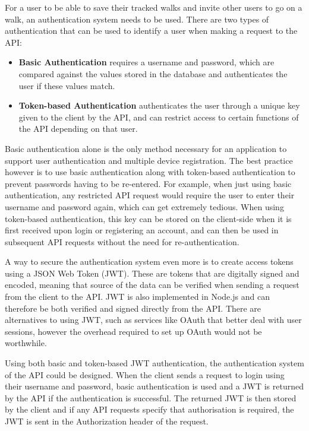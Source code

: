 For a user to be able to save their tracked walks and invite other users to go on a walk, an authentication system needs to be used. There are two types of authentication that can be used to identify a user when making a request to the API:

\begin{itemize}
  \item \textbf{Basic Authentication} requires a username and password, which are compared against the values stored in the database and authenticates the user if these values match.

  \item \textbf{Token-based Authentication} authenticates the user through a unique key given to the client by the API, and can restrict access to certain functions of the API depending on that user.
\end{itemize}

Basic authentication alone is the only method necessary for an application to support user authentication and multiple device registration. The best practice however is to use basic authentication along with token-based authentication to prevent passwords having to be re-entered. For example, when just using basic authentication, any restricted API request would require the user to enter their username and password again, which can get extremely tedious. When using token-based authentication, this key can be stored on the client-side when it is first received upon login or registering an account, and can then be used in subsequent API requests without the need for re-authentication.

A way to secure the authentication system even more is to create access tokens using a JSON Web Token (JWT). These are tokens that are digitally signed and encoded, meaning that source of the data can be verified when sending a request from the client to the API. JWT is also implemented in Node.js and can therefore be both verified and signed directly from the API. There are alternatives to using JWT, such as services like OAuth that better deal with user sessions, however the overhead required to set up OAuth would not be worthwhile.

Using both basic and token-based JWT authentication, the authentication system of the API could be designed. When the client sends a request to login using their username and password, basic authentication is used and a JWT is returned by the API if the authentication is successful. The returned JWT is then stored by the client and if any API requests specify that authorisation is required, the JWT is sent in the Authorization header of the request.
 
